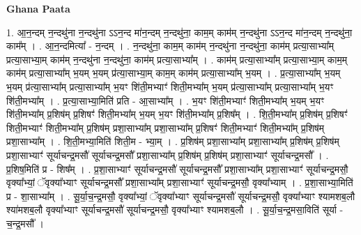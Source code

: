 \documentclass[17pt]{extarticle}
\begin{document}
\textbf{Ghana Paata } \newline

1. आ॒न॒न्दम् न॒न्दथु॑ना न॒न्दथु॑ना ऽऽन॒न्द मा॑न॒न्दम् न॒न्दथु॑ना॒ काम॒म् काम॑म् न॒न्दथु॑ना ऽऽन॒न्द मा॑न॒न्दम् न॒न्दथु॑ना॒ काम᳚म् । . आ॒न॒न्दमित्या᳚ - न॒न्दम् । . न॒न्दथु॑ना॒ काम॒म् काम॑म् न॒न्दथु॑ना न॒न्दथु॑ना॒ काम॑म् प्रत्या॒साभ्या᳚म् प्रत्या॒साभ्या॒म् काम॑म् न॒न्दथु॑ना न॒न्दथु॑ना॒ काम॑म् प्रत्या॒साभ्या᳚म् । . काम॑म् प्रत्या॒साभ्या᳚म् प्रत्या॒साभ्या॒म् काम॒म् काम॑म् प्रत्या॒साभ्या᳚म् भ॒यम् भ॒यम् प्र॑त्या॒साभ्या॒म् काम॒म् काम॑म् प्रत्या॒साभ्या᳚म् भ॒यम् । . प्र॒त्या॒साभ्या᳚म् भ॒यम् भ॒यम् प्र॑त्या॒साभ्या᳚म् प्रत्या॒साभ्या᳚म् भ॒यꣳ शि॑ती॒मभ्याꣳ॑ शिती॒मभ्या᳚म् भ॒यम् प्र॑त्या॒साभ्या᳚म् प्रत्या॒साभ्या᳚म् भ॒यꣳ शि॑ती॒मभ्या᳚म् । . प्र॒त्या॒साभ्या॒मिति॑ प्रति - आ॒साभ्या᳚म् । . भ॒यꣳ शि॑ती॒मभ्याꣳ॑ शिती॒मभ्या᳚म् भ॒यम् भ॒यꣳ शि॑ती॒मभ्या᳚म् प्र॒शिष॑म् प्र॒शिषꣳ॑ शिती॒मभ्या᳚म् भ॒यम् भ॒यꣳ शि॑ती॒मभ्या᳚म् प्र॒शिष᳚म् । . शि॒ती॒मभ्या᳚म् प्र॒शिष॑म् प्र॒शिषꣳ॑ शिती॒मभ्याꣳ॑ शिती॒मभ्या᳚म् प्र॒शिष॑म् प्रशा॒साभ्या᳚म् प्रशा॒साभ्या᳚म् प्र॒शिषꣳ॑ शिती॒मभ्याꣳ॑ शिती॒मभ्या᳚म् प्र॒शिष॑म् प्रशा॒साभ्या᳚म् । . शि॒ती॒मभ्या॒मिति॑ शिती॒म - भ्या॒म् । . प्र॒शिष॑म् प्रशा॒साभ्या᳚म् प्रशा॒साभ्या᳚म् प्र॒शिष॑म् प्र॒शिष॑म् प्रशा॒साभ्याꣳ॑ सूर्याचन्द्र॒मसौ॑ सूर्याचन्द्र॒मसौ᳚ प्रशा॒साभ्या᳚म् प्र॒शिष॑म् प्र॒शिष॑म् प्रशा॒साभ्याꣳ॑ सूर्याचन्द्र॒मसौ᳚ । . प्र॒शिष॒मिति॑ प्र - शिष᳚म् । . प्र॒शा॒साभ्याꣳ॑ सूर्याचन्द्र॒मसौ॑ सूर्याचन्द्र॒मसौ᳚ प्रशा॒साभ्या᳚म् प्रशा॒साभ्याꣳ॑ सूर्याचन्द्र॒मसौ॒ वृक्या᳚भ्यां॒ ॅवृक्या᳚भ्याꣳ सूर्याचन्द्र॒मसौ᳚ प्रशा॒साभ्या᳚म् प्रशा॒साभ्याꣳ॑ सूर्याचन्द्र॒मसौ॒ वृक्या᳚भ्याम् । . प्र॒शा॒साभ्या॒मिति॑ प्र - शा॒साभ्या᳚म् । . सू॒र्या॒च॒न्द्र॒मसौ॒ वृक्या᳚भ्यां॒ ॅवृक्या᳚भ्याꣳ सूर्याचन्द्र॒मसौ॑ सूर्याचन्द्र॒मसौ॒ वृक्या᳚भ्याꣳ श्यामशब॒लौ श्या॑मशब॒लौ वृक्या᳚भ्याꣳ सूर्याचन्द्र॒मसौ॑ सूर्याचन्द्र॒मसौ॒ वृक्या᳚भ्याꣳ श्यामशब॒लौ । . सू॒र्या॒च॒न्द्र॒मसा॒विति॑ सूर्या - च॒न्द्र॒मसौ᳚ । \newline
\end{document}
